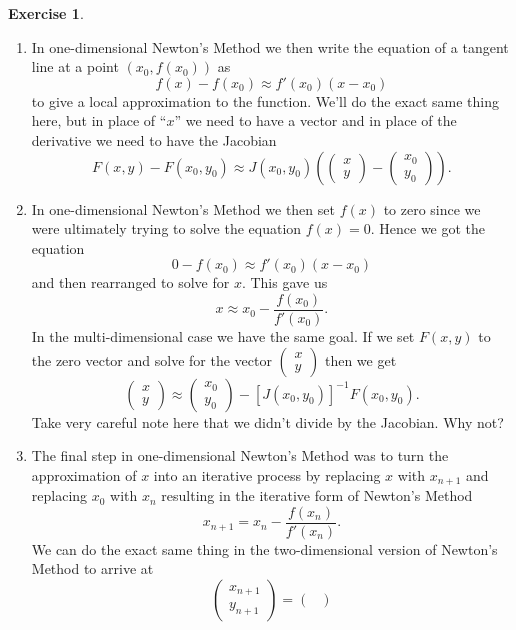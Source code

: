 \documentclass[
]{book}
\theoremstyle{definition}
\theoremstyle{definition}
\theoremstyle{definition}
\newtheorem{exercise}{Exercise}[chapter]
\theoremstyle{remark}
\begin{document}
\begin{exercise}
\begin{enumerate}
  \begin{enumerate}
  \def\labelenumii{\roman{enumii}.}
  \item
    In one-dimensional Newton's Method we then write the equation of
    a tangent line at a point \((x_0, f(x_0))\) as
    \[f(x) - f(x_0) \approx f'(x_0)(x-x_0)\] to give a local
    approximation to the function. We'll do the exact same thing
    here, but in place of ``\(x\)'' we need to have a vector and in
    place of the derivative we need to have the Jacobian
    \[F(x,y) - F(x_0,y_0) \approx J(x_0, y_0) \left( \begin{pmatrix} x \\ y
            \end{pmatrix} - \begin{pmatrix} x_0 \\ y_0 \end{pmatrix} \right).\]
  \item
    In one-dimensional Newton's Method we then set \(f(x)\) to zero
    since we were ultimately trying to solve the equation
    \(f(x) = 0\). Hence we got the equation
    \[0 - f(x_0) \approx f'(x_0)(x-x_0)\] and then rearranged to
    solve for \(x\). This gave us
    \[x \approx x_0 - \frac{f(x_0)}{f'(x_0)}.\] In the
    multi-dimensional case we have the same goal. If we set \(F(x,y)\)
    to the zero vector and solve for the vector
    \(\begin{pmatrix}x\\y\end{pmatrix}\) then we get
    \[\begin{pmatrix} x\\y\end{pmatrix} \approx \begin{pmatrix}
                   x_0 \\ y_0 \end{pmatrix} -
               \left[ J(x_0,y_0) \right]^{-1} F(x_0,y_0).\] Take
    very careful note here that we didn't divide by the Jacobian. Why not?
  \item
    The final step in one-dimensional Newton's Method was to turn
    the approximation of \(x\) into an iterative process by replacing
    \(x\) with \(x_{n+1}\) and replacing \(x_0\) with \(x_{n}\) resulting in
    the iterative form of Newton's Method
    \[x_{n+1} = x_{n} - \frac{f(x_n)}{f'(x_n)}.\] We can do the
    exact same thing in the two-dimensional version of Newton's
    Method to arrive at
    \[\begin{pmatrix} x_{n+1} \\ y_{n+1} \end{pmatrix} = \begin{pmatrix}

\end{pmatrix}\]
\end{enumerate}
\end{enumerate}
\end{exercise}
\end{document}
